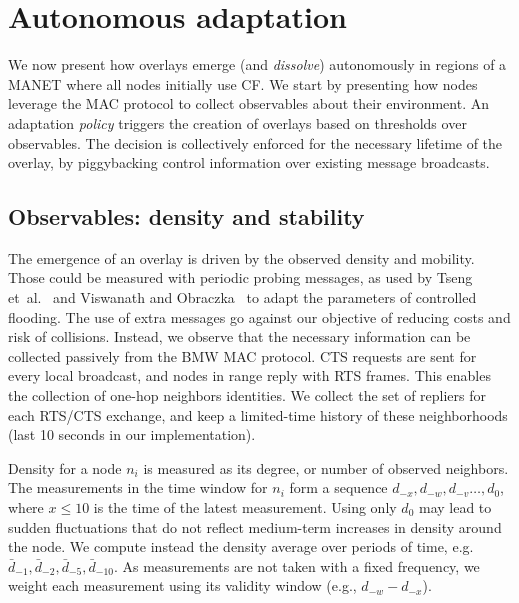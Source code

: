 
\section{Autonomous adaptation}
\label{sec:adaptation}

We now present how overlays emerge (and \emph{dissolve}) autonomously in regions of a MANET where all nodes initially use CF.
We start by presenting how nodes leverage the MAC protocol to collect observables about their environment.
An adaptation \emph{policy} triggers the creation of overlays based on thresholds over observables.
The decision is collectively enforced for the necessary lifetime of the overlay, by piggybacking control information over existing message broadcasts.

\subsection{Observables: density and stability}
\label{sec:adaptation:observables}


The emergence of an overlay is driven by the observed density and mobility.
Those could be measured with periodic probing messages, as used by Tseng et~al.~\citep{2001:AAR:876878.879323} and Viswanath and Obraczka~\citep{adaptive_group_com_iscc02} to adapt the parameters of controlled flooding.
The use of extra messages go against our objective of reducing costs and risk of collisions.
Instead, we observe that the necessary information can be collected passively from the BMW MAC protocol.
CTS requests are sent for every local broadcast, and nodes in range reply with RTS frames.
This enables the collection of one-hop neighbors identities.
We collect the set of repliers for each RTS/CTS exchange, and keep a limited-time history of these neighborhoods (last 10 seconds in our implementation).

Density for a node $n_i$ is measured as its degree, or number of observed neighbors.
The measurements in the time window for $n_i$ form a sequence $d_{-x},d_{-w},d_{-v}\dots,d_0$, where $x\leq 10$ is the time of the latest measurement. 
Using only $d_0$ may lead to sudden fluctuations that do not reflect medium-term increases in density around the node.
We compute instead the density average over periods of time, e.g. $\bar{d}_{-1},\bar{d}_{-2},\bar{d}_{-5},\bar{d}_{-10}$.
As measurements are not taken with a fixed frequency, we weight each measurement using its validity window (e.g., $d_{-w}-d_{-x}$).

